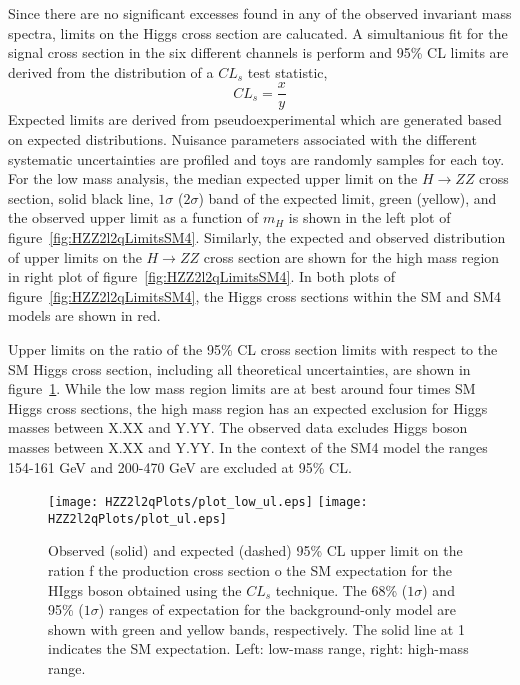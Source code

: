 Since there are no significant excesses found in any of the observed 
invariant mass spectra, limits on the Higgs cross section are calucated.
A simultanious fit for the signal cross section in the six different
channels is perform and 95\% CL limits are derived from the distribution 
of a $CL_s$ test statistic,
\begin{equation}
CL_s = \frac{x}{y}
\end{equation}
Expected limits are derived from pseudoexperimental which are generated
based on expected distributions.  Nuisance parameters associated with
the different systematic uncertainties are profiled and toys are randomly
samples for each toy.  For the low mass analysis, the median expected upper 
limit on the $H\to ZZ$ cross section, solid black line, $1\sigma$ ($2\sigma$) 
band of the expected limit,  
green (yellow), and the observed upper limit as a function of $m_H$ is 
shown in the left plot of figure~\ref{fig:HZZ2l2qLimitsSM4}.  Similarly, 
the expected and 
observed distribution of upper limits on the $H\to ZZ$ cross section are 
shown for the high mass region in right plot of 
figure~\ref{fig:HZZ2l2qLimitsSM4}.  In both plots of 
figure~\ref{fig:HZZ2l2qLimitsSM4}, the Higgs cross sections within the 
SM and SM4\cite{???} models are shown in red.  

Upper limits on the ratio of the 95\% CL cross section limits with respect
to the SM Higgs cross section, including all theoretical uncertainties, 
are shown in figure~\ref{fig:HZZ2l2qLimits}.  While the low mass region
limits are at best around four times SM Higgs cross sections, the high mass
region has an expected exclusion for Higgs masses between X.XX and Y.YY. 
The observed data excludes Higgs boson masses between X.XX and Y.YY.
In the context of the SM4 model the ranges 154-161 GeV and 200-470 GeV 
are excluded at 95\% CL. 

\begin{figure}
\begin{center}
\texttt{[image: HZZ2l2qPlots/plot\_low\_ul.eps]}
\texttt{[image: HZZ2l2qPlots/plot\_ul.eps]}
\label{fig:HZZ2l2qLimits}
\caption{Observed (solid) and expected (dashed) 95\% CL upper limit on
the ration f the production cross section o the SM expectation for the 
HIggs boson obtained using the $CL_s$ technique.  The 68\% ($1\sigma$) 
and 95\% ($1\sigma$) ranges of expectation for the background-only model
are shown with green and yellow bands, respectively.  The solid line at 
1 indicates the SM expectation.  Left: low-mass range, right: high-mass
range. }
\end{center}
\end{figure}

